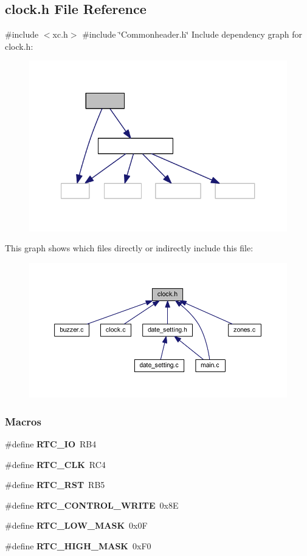 \subsection{clock.\+h File Reference}
\label{a00017}
{\ttfamily \#include $<$xc.\+h$>$}\newline
{\ttfamily \#include \char`\"{}Commonheader.\+h\char`\"{}}\newline
Include dependency graph for clock.\+h\+:
\nopagebreak
\begin{figure}[H]
\begin{center}
\leavevmode
\includegraphics[width=321pt]{a00018}
\end{center}
\end{figure}
This graph shows which files directly or indirectly include this file\+:
\nopagebreak
\begin{figure}[H]
\begin{center}
\leavevmode
\includegraphics[width=350pt]{a00019}
\end{center}
\end{figure}
\subsubsection*{Macros}
\begin{DoxyCompactItemize}
\item 
\#define \textbf{ R\+T\+C\+\_\+\+IO}~R\+B4
\item 
\#define \textbf{ R\+T\+C\+\_\+\+C\+LK}~R\+C4
\item 
\#define \textbf{ R\+T\+C\+\_\+\+R\+ST}~R\+B5
\item 
\#define \textbf{ R\+T\+C\+\_\+\+C\+O\+N\+T\+R\+O\+L\+\_\+\+W\+R\+I\+TE}~0x8E
\item 
\#define \textbf{ R\+T\+C\+\_\+\+L\+O\+W\+\_\+\+M\+A\+SK}~0x0F
\item 
\#define \textbf{ R\+T\+C\+\_\+\+H\+I\+G\+H\+\_\+\+M\+A\+SK}~0x\+F0
\end{DoxyCompactItemize}
